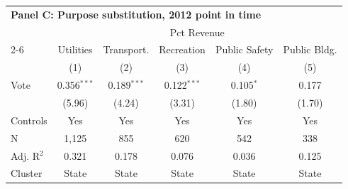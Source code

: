 \begingroup
\small
\centering
\begin{tabular*}{\textwidth}{@{\extracolsep{\fill}}lccccc}
\multicolumn{6}{l}{\textbf{Panel C: Purpose substitution, 2012 point in time}}\\

\addlinespace
   \toprule
     & \multicolumn{5}{c}{Pct Revenue} \\ 
   \cmidrule(lr){2-6}
                  & Utilities     & Transport.    & Recreation    & Public Safety & Public Bldg. \\   
                  & (1)           & (2)           & (3)           & (4)           & (5)\\  
   \midrule 
   Vote           & 0.356$^{***}$ & 0.189$^{***}$ & 0.122$^{***}$ & 0.105$^{*}$   & 0.177\\   
                  & (5.96)       & (4.24)       & (3.31)       & (1.80)       & (1.70)\\   
   \hline
   Controls       & Yes & Yes & Yes & Yes & Yes\\
   N   & 1,125         & 855           & 620           & 542           & 338\\  
   Adj. R$^2$ & 0.321         & 0.178         & 0.076         & 0.036         & 0.125\\  
   Cluster              & State & State & State & State & State\\  
   \bottomrule
\end{tabular*}
\par\endgroup
